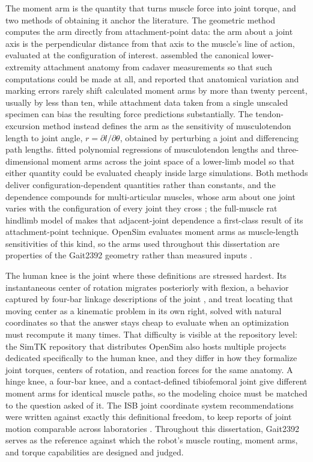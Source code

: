 The moment arm is the quantity that turns muscle force into joint torque, and two methods of obtaining it anchor the literature. The geometric method computes the arm directly from attachment-point data: the arm about a joint axis is the perpendicular distance from that axis to the muscle's line of action, evaluated at the configuration of interest. \citet{brand_model_1982} assembled the canonical lower-extremity attachment anatomy from cadaver measurements so that such computations could be made at all, and reported that anatomical variation and marking errors rarely shift calculated moment arms by more than twenty percent, usually by less than ten, while attachment data taken from a single unscaled specimen can bias the resulting force predictions substantially. The tendon-excursion method instead defines the arm as the sensitivity of musculotendon length to joint angle, $r = \partial l/\partial\theta$, obtained by perturbing a joint and differencing path lengths. \citet{menegaldo_moment_2004} fitted polynomial regressions of musculotendon lengths and three-dimensional moment arms across the joint space of a lower-limb model so that either quantity could be evaluated cheaply inside large simulations. Both methods deliver configuration-dependent quantities rather than constants, and the dependence compounds for multi-articular muscles, whose arm about one joint varies with the configuration of every joint they cross \citep{zajac_determining_1989, young_analyzing_2019}; the full-muscle rat hindlimb model of \citet{young_analyzing_2019} makes that adjacent-joint dependence a first-class result of its attachment-point technique. OpenSim evaluates moment arms as muscle-length sensitivities of this kind, so the arms used throughout this dissertation are properties of the Gait2392 geometry rather than measured inputs \citep{delp_opensim_2007, seth_opensim_2018}.

The human knee is the joint where these definitions are stressed hardest. Its instantaneous center of rotation migrates posteriorly with flexion, a behavior captured by four-bar linkage descriptions of the joint \citep{romero_four-bar_2020, steele_biomimetic_2018}, and \citet{romero_four-bar_2020} treat locating that moving center as a kinematic problem in its own right, solved with natural coordinates so that the answer stays cheap to evaluate when an optimization must recompute it many times. That difficulty is visible at the repository level: the SimTK repository that distributes OpenSim also hosts multiple projects dedicated specifically to the human knee, and they differ in how they formalize joint torques, centers of rotation, and reaction forces for the same anatomy. A hinge knee, a four-bar knee, and a contact-defined tibiofemoral joint give different moment arms for identical muscle paths, so the modeling choice must be matched to the question asked of it. The ISB joint coordinate system recommendations were written against exactly this definitional freedom, to keep reports of joint motion comparable across laboratories \citep{wu_isb_2002}. Throughout this dissertation, Gait2392 serves as the reference against which the robot's muscle routing, moment arms, and torque capabilities are designed and judged.

